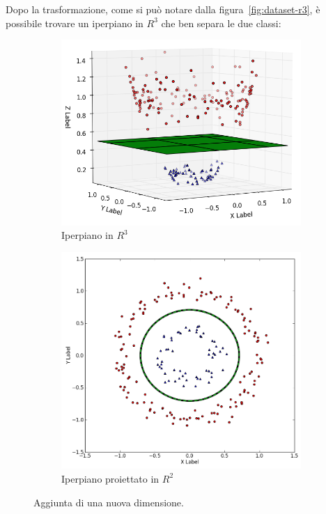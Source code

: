 \documentclass[oneside]{book}
\begin{document}
\noindent
Dopo la trasformazione, come si può notare dalla figura~\ref{fig:dataset-r3}, è possibile trovare un iperpiano in $R^3$ che ben separa le due classi:

\begin{figure}[!h]

	\begin{subfigure}[b]{0.5\textwidth}
		
		\includegraphics[width=\linewidth]{assets/svm-separable-1.png}
		\caption{Iperpiano in $R^3$}
		\label{fig:iperpiano-r3}
	\end{subfigure}
	\hfill
	\begin{subfigure}[b]{0.5\textwidth}
		\includegraphics[width=\linewidth]{assets/svm-separable-2.png}
		\caption{Iperpiano proiettato in $R^2$}
		\label{fig:iperpiano-r2}
	\end{subfigure}%
	\caption[Caption for LOF]{Aggiunta di una nuova dimensione.\footnotemark}
\end{figure}
\end{document}
